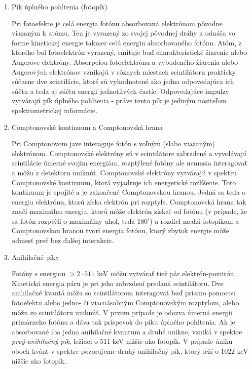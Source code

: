 \documentclass[../../main.tex]{subfiles}
\begin{document}
\begin{enumerate}
\item Pík úplného pohltenia (fotopík)

Pri fotoefekte je celá energia fotónu absorbovaná elektrónom pôvodne viazaným k atómu. Ten je vyrazený zo svojej pôvodnej dráhy a odnáša vo forme kinetickej energie takmer celú energiu absorbovaného fotónu. Atóm, z ktorého bol fotoelektrón vyrazený, emituje buď charakteristické žiarenie alebo Augerove elektróny. Absorpciou fotoelektrónu a vybudeného žiarenia alebo Augerových elektrónov vznikajú v rôznych miestach scintilátoru prakticky súčasne dve scintilácie, ktoré sú vyhodnotené ako jedna odpovedajúca ich súčtu a teda aj súčtu energií jednotlivých častíc. Odpovedajúce impulzy vytvárajú pík úplného pohltenia - práve tento pík je jediným nositeľom spektrometrickej informácie.

\item Comptonovské kontinuum a Comptonovská hrana

Pri Comptonovom jave interaguje fotón s voľným (slabo viazaným) elektrónom. Comptonovské elektróny sú v scintilátore zabrzdené a vyvolávajú scintilácie úmerné svojim energiám, rozptýlené fotóny ale nemusia interagovať a môžu z detektoru uniknúť. Comptonovské elektróny vytvárajú v spektru Comptonovské kontinuum, ktorá vyjadruje ich energetické rozlíšenie. Toto kontinuum je spojité a je zakončené Comptonovskou hranou. Jedná sa teda o energiu elektrónu, ktorú získa elektrón pri rozptyle. Comptonovská hrana tak značí maximálnu energiu, ktorú môže elektrón získať od fotónu (v prípade, že sa fotón rozptýli o maximálny uhol, teda $180^\circ$) a rozdiel medzi fotopíkom a Comptonovskou hranou tvorí energia fotónu, ktorý zbytok energie môže odniesť preč bez ďalšej interakcie.

\item Anihilačné píky

Fotóny s energiou $>2\cdot 511$ keV môžu vytvárať tiež pár elektrón-pozitrón. Kinetická energia páru je pri jeho zabrzdení predaná scintilátoru. Dve anihilačné kvantá môžu so scintilátorom interagovať buď priamo pomocou fotoefektu alebo jedno- či viacnásobným Comptonovským rozptylom, alebo môžu zo scintilátoru uniknúť. V prvom prípade je odozva úmerná energii primárneho fotónu a dáva tak príspevok do píku úplného pohltenia. Ak je absorbované iba jedno anihilačné kvantum a druhé unikne, vzniká v spektre \textit{prvý anihilačný pík}, ležiaci o $511$ keV nižšie ako fotopík. V prípade úniku oboch kvánt v spektre pozorujeme druhý anihilačný pík, ktorý leží o $1022$ keV nižšie ako fotopík.


\end{enumerate}
\end{document}
